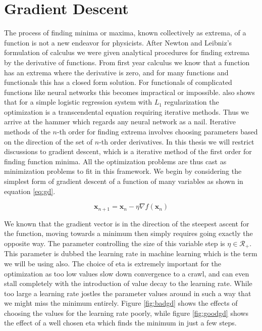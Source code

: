 \section{Gradient Descent}\label{sec:gd}

The process of finding minima or maxima, known collectively as extrema, of a function is not a new endeavor for physicists. After Newton and Leibniz's formulation of calculus we were given analytical procedures for finding extrema by the derivative of functions. From first year calculus we know that a function has an extrema where the derivative is zero, and for many functions and functionals this has a closed form solution. For functionals of complicated functions like neural networks this becomes impractical or impossible. \citet{Mehta2019} also shows that for a simple logistic regression system with $L_1$ regularization the optimization is a transcendental equation requiring iterative methods. Thus we arrive at the hammer which regards any neural network as a nail. Iterative methods of the $n$-th order for finding extrema involves choosing parameters based on the direction of the set of $n$-th order derivatives. In this thesis we will restrict discussions to gradient descent, which is a iterative method of the first order for finding function minima. All the optimization problems are thus cast as minimization problems to fit in this framework. We begin by considering the simplest form of gradient descent of a function of many variables as shown in equation \ref{eq:gd}. 

\begin{equation}\label{eq:gd}
\mathbf{x}_{n+1} = \mathbf{x}_{n} - \eta \nabla f(\mathbf{x}_{n}) 
\end{equation} 

\noindent We known that the gradient vector is in the direction of the steepest ascent for the function, moving towards a minimum then simply requires going exactly the opposite way. The parameter controlling the size of this variable step is  $\eta \in \mathcal{R}_+$. This parameter is dubbed the learning rate in machine learning which is the term we will be using also. The choice of eta is extremely important for the optimization as too low values slow down convergence to a crawl, and can even stall completely with the introduction of value decay to the learning rate. While too large a learning rate jostles the parameter values around in such a way that we might miss the minimum entirely. Figure \ref{fig:badgd} shows the effects of choosing the values for the learning rate poorly, while figure \ref{fig:goodgd} shows the effect of a well chosen eta which finds the minimum in just a few steps. 


